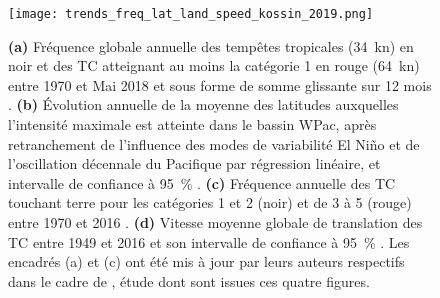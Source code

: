 \documentclass[../main.tex]{subfiles}
\begin{document}
\begin{figure}[tb]
    \centering
    \texttt{[image: trends\_freq\_lat\_land\_speed\_kossin\_2019.png]}
    \caption{\textbf{(a)} Fréquence globale annuelle des tempêtes tropicales (\SI{34}{\knot}) en noir et des TC atteignant au moins la catégorie 1 en rouge
        (\SI{64}{\knot}) entre 1970 et Mai 2018 et sous forme de somme glissante sur 12 mois \parencite{maue_recent_2011}. \textbf{(b)} Évolution annuelle de la
        moyenne des latitudes auxquelles l'intensité maximale est atteinte dans le bassin WPac, après retranchement de l'influence des modes de variabilité El Niño et de
        l'oscillation décennale du Pacifique par régression linéaire, et intervalle de confiance à \SI{95}{\percent} \parencite{kossin_comment_2018}. \textbf{(c)}
        Fréquence annuelle des TC touchant terre pour les catégories \num{1} et \num{2} (noir) et de \num{3} à \num{5} (rouge) entre 1970 et 2016
        \parencite{weinkle_historical_2012}. \textbf{(d)} Vitesse moyenne globale de translation des TC entre 1949 et 2016 et son intervalle de confiance à
        \SI{95}{\percent} \hbox{\parencite{kossin_global_2018}}. Les encadrés (a) et (c) ont été mis à jour par leurs auteurs respectifs dans le cadre de
        \textcite{knutson_tropical_2019}, étude dont sont issues ces quatre figures.}
    \label{fig:observed_trends_other}
\end{figure}
\end{document}

